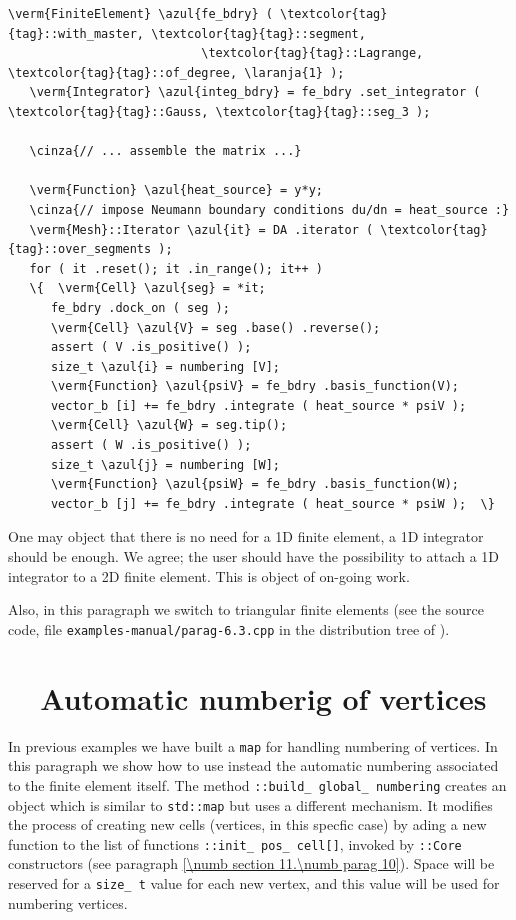 \begin{Verbatim}[commandchars=\\\{\},formatcom=\small\tt,frame=single,
   label=parag-\ref{\numb section 6.\numb parag 4}.cpp,rulecolor=\color{moldura},
   baselinestretch=0.94,framesep=2mm                                            ]
   \verm{FiniteElement} \azul{fe_bdry} ( \textcolor{tag}{tag}::with_master, \textcolor{tag}{tag}::segment,
                           \textcolor{tag}{tag}::Lagrange, \textcolor{tag}{tag}::of_degree, \laranja{1} );
   \verm{Integrator} \azul{integ_bdry} = fe_bdry .set_integrator ( \textcolor{tag}{tag}::Gauss, \textcolor{tag}{tag}::seg_3 );

   \cinza{// ... assemble the matrix ...}

   \verm{Function} \azul{heat_source} = y*y;
   \cinza{// impose Neumann boundary conditions du/dn = heat_source :}
   \verm{Mesh}::Iterator \azul{it} = DA .iterator ( \textcolor{tag}{tag}::over_segments );
   for ( it .reset(); it .in_range(); it++ )
   \{  \verm{Cell} \azul{seg} = *it;
      fe_bdry .dock_on ( seg );
      \verm{Cell} \azul{V} = seg .base() .reverse();
      assert ( V .is_positive() );
      size_t \azul{i} = numbering [V];
      \verm{Function} \azul{psiV} = fe_bdry .basis_function(V);
      vector_b [i] += fe_bdry .integrate ( heat_source * psiV );
      \verm{Cell} \azul{W} = seg.tip();
      assert ( W .is_positive() );
      size_t \azul{j} = numbering [W];
      \verm{Function} \azul{psiW} = fe_bdry .basis_function(W);
      vector_b [j] += fe_bdry .integrate ( heat_source * psiW );  \}
\end{Verbatim}

One may object that there is no need for a 1D finite element, a 1D integrator should be enough.
We agree; the user should have the possibility to attach a 1D integrator to a 2D finite element.
This is object of on-going work.

Also, in this paragraph we switch to triangular finite elements (see the source code,
file {\small\tt examples-manual/parag-6.3.cpp} in the distribution tree of \maniFEM).


\section{~~Automatic numberig of vertices}\label{\numb section 6.\numb parag 5}

In previous examples we have built a {\small\tt map} for handling numbering of vertices.
In this paragraph we show how to use instead the automatic numbering associated to the
finite element itself.
The method {\small\tt{}::build\_\,global\_\,numbering} creates
an object which is similar to {\small\tt std::map} but uses a different mechanism.
It modifies the process of creating new cells (vertices, in this specfic case)
by ading a new function to the list of functions
{\small\tt{}::init\_\,pos\_\,cell[]},
invoked by {\small\tt{}::Core} constructors
(see paragraph \ref{\numb section 11.\numb parag 10}).
Space will be reserved for a {\small\tt size\_\,t} value for each new vertex, and
this value will be used for numbering vertices.

